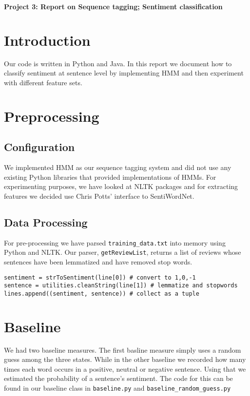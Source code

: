 \documentclass{article}
\begin{document}
\begin{center}\textbf{Project 3: Report on Sequence tagging; Sentiment classification}\end{center}

\section{Introduction}

Our code is written in Python and Java. In this report we document how to classify sentiment at sentence level by implementing HMM and then experiment with different feature sets.

\section{Preprocessing}
\subsection{Configuration}
We implemented HMM as our sequence tagging system and did not use any existing Python libraries that provided implementations of HMMs. For experimenting purposes, we have looked at NLTK packages and for extracting features we decided use Chris Potts' interface to SentiWordNet.
\subsection{Data Processing}
For pre-processing we have parsed \texttt{training\_data.txt} into memory using Python and NLTK. Our parser, \texttt{getReviewList}, returns a list of reviews whose sentences have been lemmatized and have removed stop words.

\begin{verbatim}
sentiment = strToSentiment(line[0]) # convert to 1,0,-1
sentence = utilities.cleanString(line[1]) # lemmatize and stopwords
lines.append((sentiment, sentence)) # collect as a tuple
\end{verbatim}

\section{Baseline}

We had two baseline measures. The first basline measure simply uses a random guess among the three states. While in the other baseline we recorded how many times each word occurs in a positive, neutral or negative sentence. Using that we estimated the probability of a sentence's sentiment. The code for this can be found in our baseline class in \texttt{baseline.py} and \texttt{baseline\_random\_guess.py}
\end{document}
